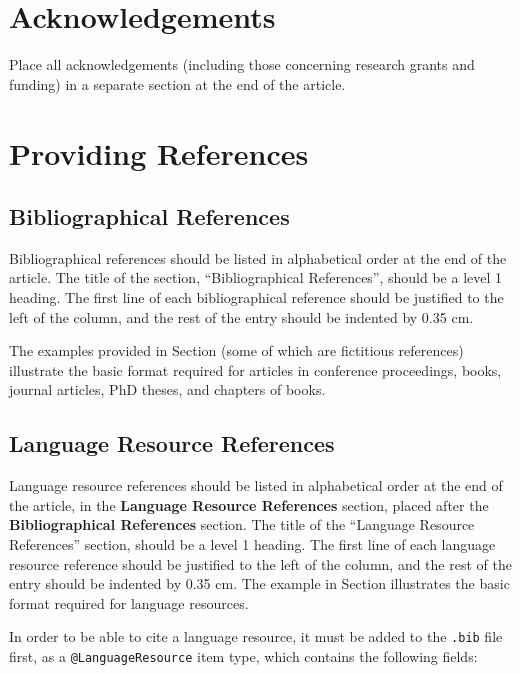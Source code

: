 \documentclass[10pt, a4paper]{article}
\newcommand{\secref}[1]{\StrSubstitute{\getrefnumber{#1}}{.}{ }}
\begin{document}
\section{Acknowledgements}

Place all acknowledgements (including those concerning research grants and
funding) in a separate section at the end of the article.

\section{Providing References}

\subsection{Bibliographical References}
Bibliographical references should be listed in alphabetical order at the
end of the article. The title of the section, ``Bibliographical References'',
should be a level 1 heading. The first line of each bibliographical reference
should be justified to the left of the column, and the rest of the entry should
be indented by 0.35 cm.

The examples provided in Section \secref{main:ref} (some of which are fictitious
references) illustrate the basic format required for articles in conference
proceedings, books, journal articles, PhD theses, and chapters of books.

\subsection{Language Resource References}

Language resource references should be listed in alphabetical order at the end
of the article, in the \textbf{Language Resource References} section, placed after
the \textbf{Bibliographical References} section. The title of the ``Language Resource
References'' section, should be a level 1 heading. The first line of each
language resource reference should be justified to the left of the column, and
the rest of the entry should be indented by 0.35 cm. The example in Section 
\secref{lr:ref} illustrates the basic format required for language resources.

In order to be able to cite a language resource, it must be added to
the \texttt{.bib} file first, as a \texttt{@LanguageResource} item type, which
contains the following fields:
\end{document}
